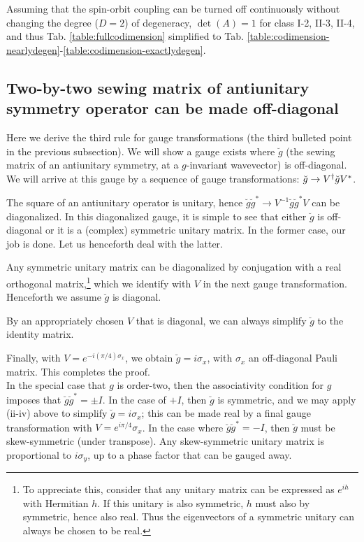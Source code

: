 \documentclass[aps, showpacs, twocolumn, notitlepage, superscriptaddress]{revtex4-1}
\begin{document}
Assuming that the spin-orbit coupling can be turned off continuously without changing the degree ($D=2$) of degeneracy, $\det(A)=1$ for class I-2, II-3, II-4, and thus Tab. \ref{table:fullcodimension} simplified to Tab. \ref{table:codimension-nearlydegen}-\ref{table:codimension-exactlydegen}.

\subsection{Two-by-two sewing matrix of antiunitary symmetry operator can be made off-diagonal\label{app:makinggoffdiagonal}}

Here we derive the third rule for gauge transformations (the third bulleted point in the previous subsection). We will show a gauge exists where $\breve{g}$ (the sewing matrix of an antiunitary symmetry, at a $g$-invariant wavevector) is off-diagonal. We will arrive at this gauge by a sequence of gauge transformations: $\breve{g}\rightarrow V^{\scriptstyle{\dagger}}\breve{g}V^*$.

 The square of an antiunitary operator is unitary, hence $\breve{g}\breve{g}^* \rightarrow V^{-1}\breve{g}\breve{g}^*V$ can be diagonalized. In this diagonalized gauge, it is simple to see that either $\breve{g}$ is off-diagonal or it is a (complex) symmetric unitary matrix. In the former case, our job is done. Let us henceforth deal with the latter.

 Any symmetric unitary matrix can be diagonalized by conjugation with a real orthogonal matrix,\footnote{To appreciate this, consider that any unitary matrix can be expressed as $e^{ih}$ with Hermitian $h$. If this unitary is also symmetric, $h$ must also by symmetric, hence also real. Thus the eigenvectors of a symmetric unitary can always be chosen to be real.} which we identify with $V$ in the next gauge transformation. Henceforth we assume $\breve{g}$ is diagonal. 

 By an appropriately chosen $V$ that is diagonal, we can always simplify $\breve{g}$ to the identity matrix.

 Finally, with $V=e^{-i(\pi/4)\sigma_x}$, we obtain $\breve{g}=i\sigma_x$, with $\sigma_x$ an off-diagonal Pauli matrix. This completes the proof.\\

In the special case that $g$ is order-two, then the associativity condition for $g$ imposes that $\breve{g}\breve{g}^*=\pm I$. In the case of $+I$, then $\breve{g}$ is symmetric, and we may apply (ii-iv) above to simplify $\breve{g}=i\sigma_x$; this can be made real by a final gauge transformation with $V=e^{i\pi/4}\sigma_x$. In the case where $\breve{g}\breve{g}^*=-I$, then $\breve{g}$ must be skew-symmetric (under transpose). Any skew-symmetric unitary matrix is proportional to $i\sigma_y$, up to a phase factor that can be gauged away.


\end{document}

